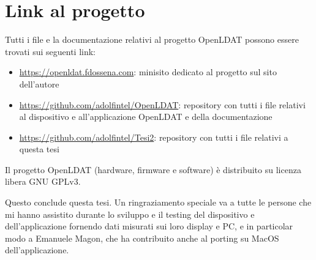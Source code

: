 \section{Link al progetto}
Tutti i file e la documentazione relativi al progetto OpenLDAT possono essere trovati sui seguenti link:\begin{itemize} %
	\item \href{https://openldat.fdossena.com}{https://openldat.fdossena.com}: minisito dedicato al progetto sul sito dell'autore
	\item \href{https://github.com/adolfintel/OpenLDAT}{https://github.com/adolfintel/OpenLDAT}: repository con tutti i file relativi al dispositivo e all'applicazione OpenLDAT e della documentazione
	\item \href{https://github.com/adolfintel/Tesi2}{https://github.com/adolfintel/Tesi2}: repository con tutti i file relativi a questa tesi %
\end{itemize}

Il progetto OpenLDAT (hardware, firmware e software) è distribuito su licenza libera GNU GPLv3.

Questo conclude questa tesi. Un ringraziamento speciale va a tutte le persone che mi hanno assistito durante lo sviluppo e il testing del dispositivo e dell'applicazione fornendo dati misurati sui loro display e PC, e in particolar modo a Emanuele Magon, che ha contribuito anche al porting su MacOS dell'applicazione.
